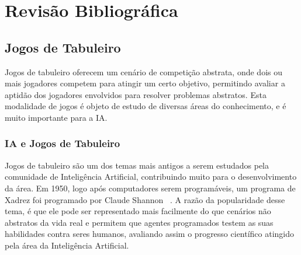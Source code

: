 




\chapter{\label{chap:revbiblio}Revisão Bibliográfica}


\section{\label{sec:secao1}Jogos de Tabuleiro}

Jogos de tabuleiro oferecem um cenário de competição abstrata, onde dois ou mais jogadores competem para atingir um certo objetivo, permitindo avaliar a aptidão dos jogadores envolvidos para resolver problemas abstratos. Esta modalidade de jogos é objeto de estudo de diversas áreas do conhecimento, e é muito importante para a IA.

\subsection{\label{sec:secao1.1}IA e Jogos de Tabuleiro}

Jogos de tabuleiro são um dos temas mais antigos a serem estudados pela comunidade de Inteligência Artificial, contribuindo muito para o desenvolvimento da área. Em 1950, logo após computadores serem programáveis, um programa de Xadrez foi programado por Claude Shannon ~\cite{CLAUDESHANNONCHESS}. A razão da popularidade desse tema, é que ele pode ser representado mais facilmente do que cenários não abstratos da vida real e permitem que agentes programados testem as suas habilidades contra seres humanos, avaliando assim o progresso científico atingido pela área da Inteligência Artificial.
 
